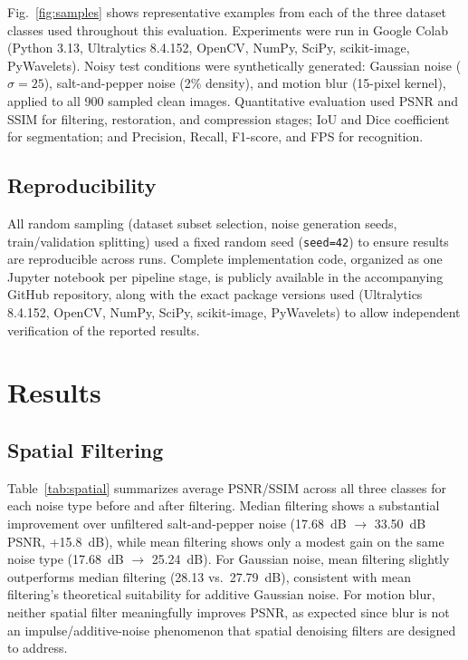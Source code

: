 \documentclass[conference]{IEEEtran}
\begin{document}
Fig.~\ref{fig:samples} shows representative examples from each of the three dataset classes used throughout this evaluation. Experiments were run in Google Colab (Python 3.13, Ultralytics 8.4.152, OpenCV, NumPy, SciPy, scikit-image, PyWavelets). Noisy test conditions were synthetically generated: Gaussian noise ($\sigma=25$), salt-and-pepper noise (2\% density), and motion blur (15-pixel kernel), applied to all 900 sampled clean images. Quantitative evaluation used PSNR and SSIM for filtering, restoration, and compression stages; IoU and Dice coefficient for segmentation; and Precision, Recall, F1-score, and FPS for recognition.

\subsection{Reproducibility}
All random sampling (dataset subset selection, noise generation seeds, train/validation splitting) used a fixed random seed (\texttt{seed=42}) to ensure results are reproducible across runs. Complete implementation code, organized as one Jupyter notebook per pipeline stage, is publicly available in the accompanying GitHub repository, along with the exact package versions used (Ultralytics 8.4.152, OpenCV, NumPy, SciPy, scikit-image, PyWavelets) to allow independent verification of the reported results.

\section{Results}

\subsection{Spatial Filtering}
Table~\ref{tab:spatial} summarizes average PSNR/SSIM across all three classes for each noise type before and after filtering. Median filtering shows a substantial improvement over unfiltered salt-and-pepper noise (17.68~dB $\rightarrow$ 33.50~dB PSNR, +15.8~dB), while mean filtering shows only a modest gain on the same noise type (17.68~dB $\rightarrow$ 25.24~dB). For Gaussian noise, mean filtering slightly outperforms median filtering (28.13 vs.\ 27.79~dB), consistent with mean filtering's theoretical suitability for additive Gaussian noise. For motion blur, neither spatial filter meaningfully improves PSNR, as expected since blur is not an impulse/additive-noise phenomenon that spatial denoising filters are designed to address.
\end{document}

